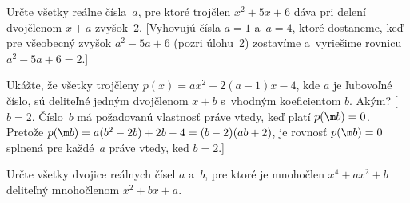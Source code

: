 {Určte všetky reálne čísla~$a$, pre ktoré trojčlen
$x^2+5x+6$ dáva pri delení dvojčlenom $x+a$ zvyšok~$2$. [Vyhovujú
čísla $a=1$ a~$a=4$, ktoré dostaneme, keď pre
všeobecný zvyšok $a^2-5a+6$ (pozri úlohu~2) zostavíme a~vyriešime
rovnicu $a^2-5a+6=2$.]


Ukážte, že všetky trojčleny $p(x)=ax^2+2(a-1)x-4$, kde
$a$ je ľubovoľné číslo, sú
deliteľné jedným dvojčlenom $x+b$ s~vhodným koeficientom
$b$. Akým? [$b=2$. Číslo~$b$ má požadovanú vlastnosť práve vtedy,
keď platí $p(\m b)=0$. Pretože $p(\m b)=a({b^2-2b})+2b-4=(b-2)(ab+2)$, je
rovnosť $p(\m b)=0$ splnená pre každé~$a$ práve vtedy, keď $b=2$.]

Určte všetky dvojice reálnych čísel $a$ a~$b$, pre ktoré
je mnohočlen $x^4+ax^2+b$ deliteľný mnohočlenom $x^2+bx+a$.
\vpravo{[56--B--S--1]}
}

